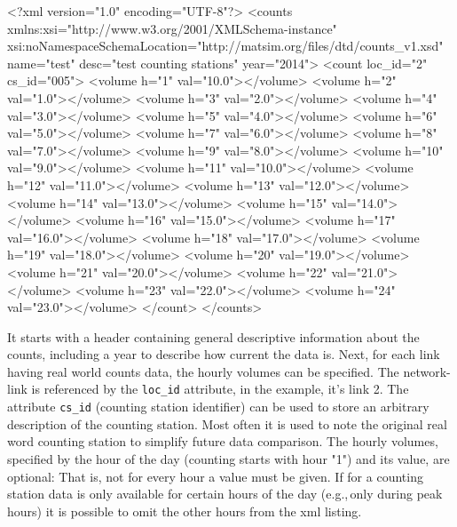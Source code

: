 \begin{xml}
<?xml version="1.0" encoding="UTF-8"?> 
<counts xmlns:xsi="http://www.w3.org/2001/XMLSchema-instance" 
        xsi:noNamespaceSchemaLocation="http://matsim.org/files/dtd/counts_v1.xsd" 
        name="test" desc="test counting stations" year="2014"> 
   <count loc_id="2" cs_id="005"> 
      <volume h="1" val="10.0"></volume> 
      <volume h="2" val="1.0"></volume> 
      <volume h="3" val="2.0"></volume> 
      <volume h="4" val="3.0"></volume> 
      <volume h="5" val="4.0"></volume> 
      <volume h="6" val="5.0"></volume> 
      <volume h="7" val="6.0"></volume> 
      <volume h="8" val="7.0"></volume> 
      <volume h="9" val="8.0"></volume> 
      <volume h="10" val="9.0"></volume> 
      <volume h="11" val="10.0"></volume> 
      <volume h="12" val="11.0"></volume> 
      <volume h="13" val="12.0"></volume> 
      <volume h="14" val="13.0"></volume> 
      <volume h="15" val="14.0"></volume> 
      <volume h="16" val="15.0"></volume> 
      <volume h="17" val="16.0"></volume> 
      <volume h="18" val="17.0"></volume> 
      <volume h="19" val="18.0"></volume> 
      <volume h="20" val="19.0"></volume> 
      <volume h="21" val="20.0"></volume> 
      <volume h="22" val="21.0"></volume> 
      <volume h="23" val="22.0"></volume> 
      <volume h="24" val="23.0"></volume> 
   </count> 
</counts>
\end{xml}

It starts with a header containing general descriptive information about the counts, including a year to describe how current the data is. Next, for each link having real world counts data, the hourly volumes can be specified. The network-link is referenced by the \lstinline|loc_id| attribute, in the example, it's link 2. The attribute \lstinline|cs_id| (counting station identifier) can be used to store an arbitrary description of the counting station. Most often it is used to note the original real word counting station to simplify future data comparison. The hourly volumes, specified by the hour of the day (counting starts with hour "1") and its value, are optional: That is, not for every hour a value must be given. If for a counting station data is only available for certain hours of the day (e.g.,\,only during peak hours) it is possible to omit the other hours from the \gls{xml} listing. 

